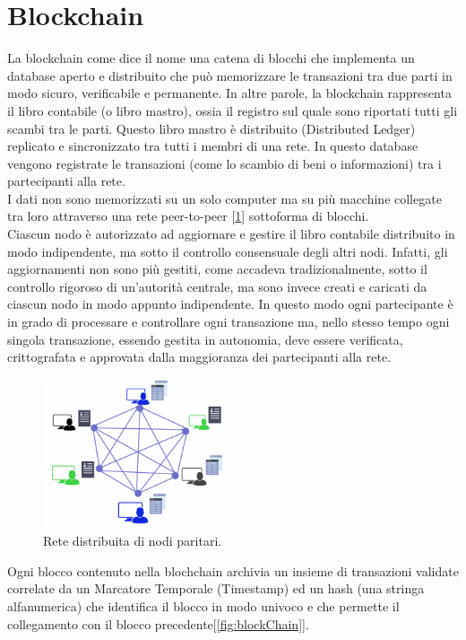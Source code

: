 \section{Blockchain}
\label{sec:blockchain}

La blockchain come dice il nome una catena di blocchi che implementa un database  aperto e distribuito che può memorizzare le transazioni tra due parti in modo sicuro, verificabile e permanente. In altre parole, la blockchain rappresenta il libro contabile (o libro mastro), ossia il registro sul quale sono riportati tutti gli scambi tra le parti. Questo libro mastro è distribuito (Distributed Ledger) replicato e sincronizzato tra tutti i membri di una rete. In questo database vengono registrate le transazioni (come lo scambio di beni o informazioni) tra i partecipanti alla rete.
\\I dati non sono memorizzati su un solo computer ma su più macchine collegate tra loro attraverso una rete peer-to-peer [\ref{fig:blockchainNetwork}] sottoforma di blocchi.
\\Ciascun nodo è autorizzato ad aggiornare e gestire il libro contabile distribuito in modo indipendente, ma sotto il controllo consensuale degli altri nodi. Infatti, gli aggiornamenti non sono più gestiti, come accadeva tradizionalmente, sotto il controllo rigoroso di un’autorità centrale, ma sono invece creati e caricati da ciascun nodo in modo appunto indipendente. In questo modo ogni partecipante è in grado di processare e controllare ogni transazione ma, nello stesso tempo ogni singola transazione, essendo gestita in autonomia, deve essere verificata, crittografata e approvata dalla maggioranza dei partecipanti alla rete. 

\begin{figure}[H]
	\centering
	\includegraphics[width=0.5\textwidth]{images/blockchainNetwork.png}
	\caption{Rete distribuita di nodi paritari.}
	\label{fig:blockchainNetwork}
\end{figure}

Ogni blocco contenuto nella blochchain archivia un insieme di transazioni validate correlate da un Marcatore Temporale (Timestamp) ed un hash (una stringa alfanumerica) che identifica il blocco in modo univoco e che permette il collegamento con il blocco precedente[\ref{fig:blockChain}].

